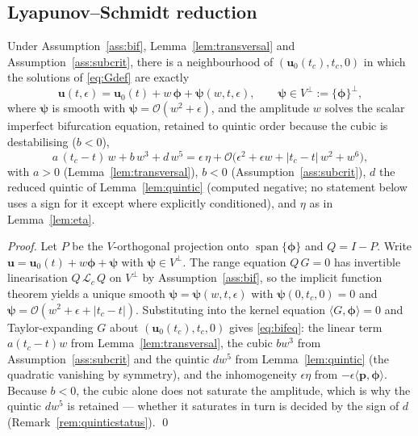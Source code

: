 \subsection{Lyapunov--Schmidt reduction}

\begin{proposition}
    \label{prop:LS}
    Under Assumption~\ref{ass:bif}, Lemma~\ref{lem:transversal} and Assumption~\ref{ass:subcrit}, there is a
    neighbourhood of $(\bm{u}_0(t_c),t_c,0)$ in which the solutions of \eqref{eq:Gdef} are exactly
    \begin{equation}
        \bm{u}(t,\epsilon) = \bm{u}_0(t) + w\,\bm{\phi} + \bm{\psi}(w,t,\epsilon),
        \qquad \bm{\psi}\in V^\perp:=\{\bm{\phi}\}^{\perp},
    \end{equation}
    where $\bm{\psi}$ is smooth with $\bm{\psi}=\mathcal{O}(w^2+\epsilon)$, and the amplitude $w$ solves the scalar
    imperfect bifurcation equation, retained to quintic order because the cubic is destabilising ($b<0$),
    \begin{equation}
        \label{eq:bifeq}
        a\,(t_c-t)\,w + b\,w^3 + d\,w^5 = \epsilon\,\eta + \mathcal{O}\!\big(\epsilon^2 + \epsilon w + |t_c-t|\,w^2 + w^6\big),
    \end{equation}
    with $a>0$ (Lemma~\ref{lem:transversal}), $b<0$ (Assumption~\ref{ass:subcrit}), $d$ the reduced quintic of
    Lemma~\ref{lem:quintic} (computed negative; no statement below uses a sign for it except where explicitly
    conditioned), and $\eta$ as in Lemma~\ref{lem:eta}.
\end{proposition}

\begin{proof}
    Let $P$ be the $V$-orthogonal projection onto $\operatorname{span}\{\bm{\phi}\}$ and $Q=I-P$. Write
    $\bm{u}=\bm{u}_0(t)+w\bm{\phi}+\bm{\psi}$ with $\bm{\psi}\in V^\perp$. The range equation $Q\,G=0$ has invertible
    linearisation $Q\,\mathcal{L}_c\,Q$ on $V^\perp$ by Assumption~\ref{ass:bif}, so the implicit function theorem
    yields a unique smooth $\bm{\psi}=\bm{\psi}(w,t,\epsilon)$ with $\bm{\psi}(0,t_c,0)=0$ and
    $\bm{\psi}=\mathcal{O}(w^2+\epsilon+|t_c-t|)$. Substituting into the kernel equation $\langle G,\bm{\phi}\rangle=0$
    and Taylor-expanding $G$ about $(\bm{u}_0(t_c),t_c,0)$ gives \eqref{eq:bifeq}: the linear term $a(t_c-t)w$ from
    Lemma~\ref{lem:transversal}, the cubic $bw^3$ from Assumption~\ref{ass:subcrit} and the quintic $dw^5$ from
    Lemma~\ref{lem:quintic} (the quadratic
    vanishing by symmetry), and the inhomogeneity $\epsilon\eta$ from $-\epsilon\langle\bm{p},\bm{\phi}\rangle$. Because
    $b<0$, the cubic alone does not saturate the amplitude, which is why the quintic $dw^5$ is retained --- whether it
    saturates in turn is decided by the sign of $d$ (Remark~\ref{rem:quinticstatus}). \qed
\end{proof}

